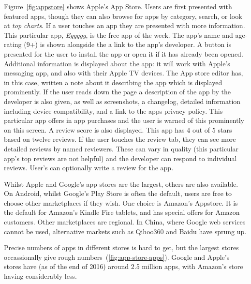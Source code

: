 \documentclass[thesis.tex]{subfiles}
\begin{document}
Figure~\ref{fig:appstore} shows Apple's App Store.  Users are first
presented with featured apps, though they can also browse for apps by
category, search, or look at \emph{top charts}.  If a user touches an
app they are presented with more information.  This particular app,
\emph{Eggggg}, is the free app of the week.  The app's name and
age-rating (9+) is shown alongside the a link to the app's developer.
A button is presented for the user to install the app or open it if it
has already been opened.  Additional information is displayed about
the app: it will work with Apple's messaging app, and also with their
Apple TV devices.  The App store editor has, in this case, written a
note about it describing the app which is displayed prominently.  If
the user reads down the page a description of the app by the developer
is also given, as well as screenshots, a changelog, detailed
information including device compatibility, and a link to the apps
privacy policy.  This particular app offers in app purchases and the
user is warned of this prominently on this screen.  A review score is
also displayed. This app has 4 out of 5 stars based on twelve reviews.
If the user touches the review tab, they can see more detailed reviews
by named reviewers.  These can vary in quality (this particular app's
top reviews are not helpful) and the developer can respond to
individual reviews.  User's can optionally write a review for the app.

Whilst Apple and Google's app stores are the largest, others are also
available.  On Android, whilst Google's Play Store is often the
default, users are free to choose other marketplaces if they wish.
One choice is Amazon's Appstore.  It is the default for Amazon's
Kindle Fire tablets, and has special offers for Amazon customers.
Other marketplaces are regional.  In China, where Google web services
cannot be used, alternative markets such as Qihoo360 and Baidu have
sprung up.

Precise numbers of apps in different stores is hard to get, but the
largest stores occassionally give rough
numbers~(\autoref{fig:app-store-apps}).  Google and Apple's stores
have (as of the end of 2016) around 2.5 million apps, with Amazon's
store having considerably less.
\end{document}
